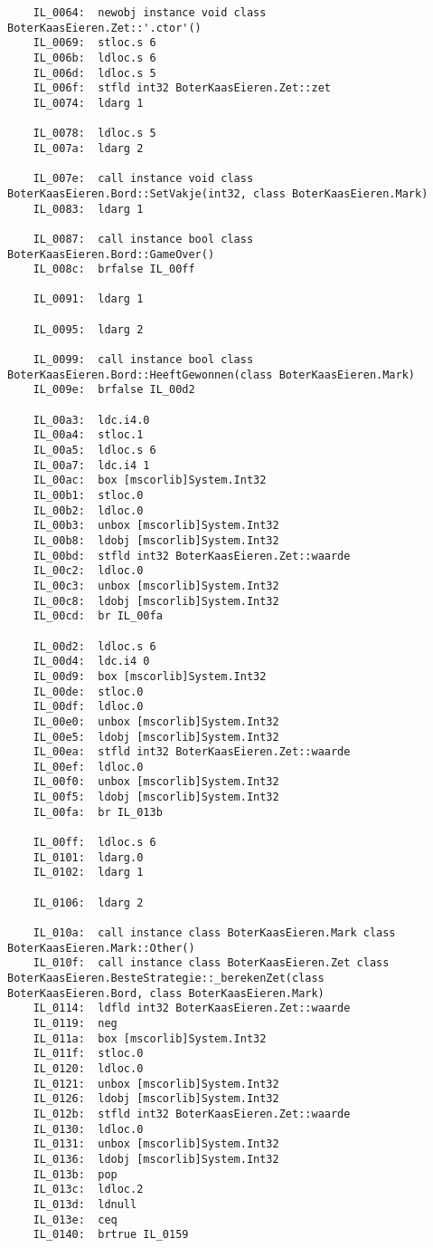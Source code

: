 \begin{lstlisting}
	IL_0064:  newobj instance void class BoterKaasEieren.Zet::'.ctor'()
	IL_0069:  stloc.s 6
	IL_006b:  ldloc.s 6
	IL_006d:  ldloc.s 5
	IL_006f:  stfld int32 BoterKaasEieren.Zet::zet
	IL_0074:  ldarg 1

	IL_0078:  ldloc.s 5
	IL_007a:  ldarg 2

	IL_007e:  call instance void class BoterKaasEieren.Bord::SetVakje(int32, class BoterKaasEieren.Mark)
	IL_0083:  ldarg 1

	IL_0087:  call instance bool class BoterKaasEieren.Bord::GameOver()
	IL_008c:  brfalse IL_00ff

	IL_0091:  ldarg 1

	IL_0095:  ldarg 2

	IL_0099:  call instance bool class BoterKaasEieren.Bord::HeeftGewonnen(class BoterKaasEieren.Mark)
	IL_009e:  brfalse IL_00d2

	IL_00a3:  ldc.i4.0 
	IL_00a4:  stloc.1 
	IL_00a5:  ldloc.s 6
	IL_00a7:  ldc.i4 1
	IL_00ac:  box [mscorlib]System.Int32
	IL_00b1:  stloc.0 
	IL_00b2:  ldloc.0 
	IL_00b3:  unbox [mscorlib]System.Int32
	IL_00b8:  ldobj [mscorlib]System.Int32
	IL_00bd:  stfld int32 BoterKaasEieren.Zet::waarde
	IL_00c2:  ldloc.0 
	IL_00c3:  unbox [mscorlib]System.Int32
	IL_00c8:  ldobj [mscorlib]System.Int32
	IL_00cd:  br IL_00fa

	IL_00d2:  ldloc.s 6
	IL_00d4:  ldc.i4 0
	IL_00d9:  box [mscorlib]System.Int32
	IL_00de:  stloc.0 
	IL_00df:  ldloc.0 
	IL_00e0:  unbox [mscorlib]System.Int32
	IL_00e5:  ldobj [mscorlib]System.Int32
	IL_00ea:  stfld int32 BoterKaasEieren.Zet::waarde
	IL_00ef:  ldloc.0 
	IL_00f0:  unbox [mscorlib]System.Int32
	IL_00f5:  ldobj [mscorlib]System.Int32
	IL_00fa:  br IL_013b

	IL_00ff:  ldloc.s 6
	IL_0101:  ldarg.0 
	IL_0102:  ldarg 1

	IL_0106:  ldarg 2

	IL_010a:  call instance class BoterKaasEieren.Mark class BoterKaasEieren.Mark::Other()
	IL_010f:  call instance class BoterKaasEieren.Zet class BoterKaasEieren.BesteStrategie::_berekenZet(class BoterKaasEieren.Bord, class BoterKaasEieren.Mark)
	IL_0114:  ldfld int32 BoterKaasEieren.Zet::waarde
	IL_0119:  neg 
	IL_011a:  box [mscorlib]System.Int32
	IL_011f:  stloc.0 
	IL_0120:  ldloc.0 
	IL_0121:  unbox [mscorlib]System.Int32
	IL_0126:  ldobj [mscorlib]System.Int32
	IL_012b:  stfld int32 BoterKaasEieren.Zet::waarde
	IL_0130:  ldloc.0 
	IL_0131:  unbox [mscorlib]System.Int32
	IL_0136:  ldobj [mscorlib]System.Int32
	IL_013b:  pop 
	IL_013c:  ldloc.2 
	IL_013d:  ldnull 
	IL_013e:  ceq 
	IL_0140:  brtrue IL_0159


\end{lstlisting}
